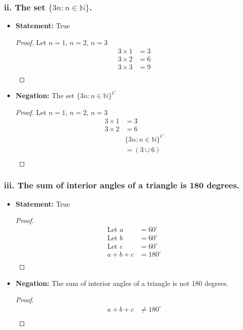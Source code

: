 \documentclass{article}
\begin{document}
 \subsubsection*{ii. The set $\{3n: n \in \mathbb{N}\}$.}
\begin{itemize}
    \item[] \textbf{Statement: } True
    \begin{proof}
        Let $n = 1$, $n = 2$, $n = 3$
           \begin{align*}
               3 \times 1 &= 3 \\
               3 \times 2 &= 6 \\
               3 \times 3 &= 9 \\
           \end{align*}
    \end{proof}
    \item[] \textbf{Negation: } The set $\{3n: n \in \mathbb{N}\}^C$ 
    \begin{proof}
        Let $n = 1$, $n = 2$, $n = 3$
           \begin{align*}
               3 \times 1 &= 3 \\
               3 \times 2 &= 6 \\
               &\{3n: n \in \mathbb{N}\}^C \\ 
               &= (3 \cup 6 ) \\               
           \end{align*}
    \end{proof}
\end{itemize}
\subsubsection*{iii. The sum of interior angles of a triangle is 180 degrees.}
\begin{itemize}
    \item[] \textbf{Statement: } True
    \begin{proof}
        \begin{align*}
            \text{Let } a &= 60^\circ \\
            \text{Let } b &= 60^\circ \\
            \text{Let } c &= 60^\circ \\
            a + b + c &= 180^\circ \\
        \end{align*}
    \end{proof}
    \item[] \textbf{Negation: } The sum of interior angles of a triangle is not 180 degrees.
    \begin{proof}
        \begin{align*}
            a + b + c &\neq 180^\circ \\
        \end{align*}
    \end{proof}
\end{itemize}
\end{document}
